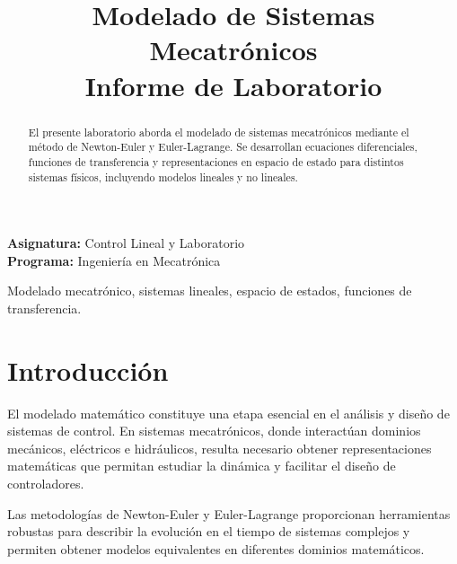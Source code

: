 \documentclass[conference]{IEEEtran}
\begin{document}
\raggedbottom

\title{Modelado de Sistemas Mecatrónicos\\
{\normalsize Informe de Laboratorio}}

\author{
\and
{}
}

\maketitle
\thispagestyle{fancy}

\begin{center}
\textbf{Asignatura:} Control Lineal y Laboratorio\\
\textbf{Programa:} Ingeniería en Mecatrónica
\end{center}

\begin{abstract}
El presente laboratorio aborda el modelado de sistemas mecatrónicos mediante el método de Newton-Euler y Euler-Lagrange. Se desarrollan ecuaciones diferenciales, funciones de transferencia y representaciones en espacio de estado para distintos sistemas físicos, incluyendo modelos lineales y no lineales.
\end{abstract}

\begin{IEEEkeywords}
Modelado mecatrónico, sistemas lineales, espacio de estados, funciones de transferencia.
\end{IEEEkeywords}

\section{Introducción}

El modelado matemático constituye una etapa esencial en el análisis y diseño de sistemas de control. En sistemas mecatrónicos, donde interactúan dominios mecánicos, eléctricos e hidráulicos, resulta necesario obtener representaciones matemáticas que permitan estudiar la dinámica y facilitar el diseño de controladores.

Las metodologías de Newton-Euler y Euler-Lagrange proporcionan herramientas robustas para describir la evolución en el tiempo de sistemas complejos y permiten obtener modelos equivalentes en diferentes dominios matemáticos.
\end{document}
